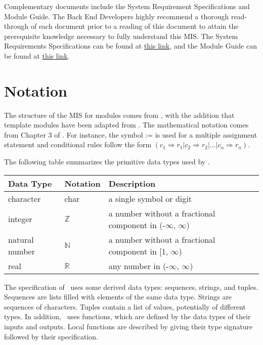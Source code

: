 \documentclass[12pt, titlepage]{article}
\begin{document}
Complementary documents include the System Requirement Specifications and Module Guide. The Back End Developers highly recommend a thorough read-through of each document prior to a reading of this document to attain the prerequisite knowledge necessary to fully understand this MIS. The System Requirements Specifications can be found at \href{https://github.com/zakerl/Capstone_Project/blob/main/docs/SRS/SRS.tex}{this link}, and the Module Guide can be found at \href{https://github.com/zakerl/Capstone_Project/blob/main/docs/Design/SoftArchitecture/MG.pdf}{this link}.

\section{Notation}

The structure of the MIS for modules comes from \citet{HoffmanAndStrooper1995},
with the addition that template modules have been adapted from
\cite{GhezziEtAl2003}.  The mathematical notation comes from Chapter 3 of
\citet{HoffmanAndStrooper1995}.  For instance, the symbol := is used for a
multiple assignment statement and conditional rules follow the form $(c_1
\Rightarrow r_1 | c_2 \Rightarrow r_2 | ... | c_n \Rightarrow r_n )$.

The following table summarizes the primitive data types used by \progname. 

\begin{center}
\renewcommand{\arraystretch}{1.2}
\noindent 
\begin{tabular}{l l p{7.5cm}} 
\toprule 
\textbf{Data Type} & \textbf{Notation} & \textbf{Description}\\ 
\midrule
character & char & a single symbol or digit\\
integer & $\mathbb{Z}$ & a number without a fractional component in (-$\infty$, $\infty$) \\
natural number & $\mathbb{N}$ & a number without a fractional component in [1, $\infty$) \\
real & $\mathbb{R}$ & any number in (-$\infty$, $\infty$)\\
\bottomrule
\end{tabular} 
\end{center}

\noindent
The specification of \progname \ uses some derived data types: sequences, strings, and
tuples. Sequences are lists filled with elements of the same data type. Strings
are sequences of characters. Tuples contain a list of values, potentially of
different types. In addition, \progname \ uses functions, which
are defined by the data types of their inputs and outputs. Local functions are
described by giving their type signature followed by their specification.
\end{document}
